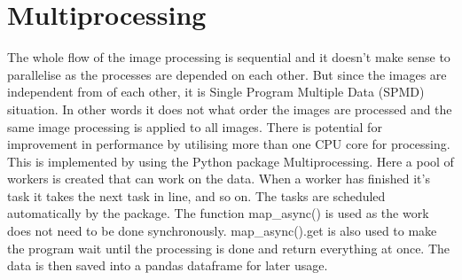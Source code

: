 \section{Multiprocessing}
The whole flow of the image processing is sequential and it doesn't make sense to parallelise as the processes are depended on each other. But since the images are independent from of each other, it is Single Program Multiple Data (SPMD) situation. In other words it does not what order the images are processed and the same image processing is applied to all images. There is potential for improvement in performance by utilising more than one CPU core for processing. This is implemented by using the Python package Multiprocessing. Here a pool of workers is created that can work on the data. When a worker has finished it's task it takes the next task in line, and so on. The tasks are scheduled automatically by the package. The function map_async() is used as the work does not need to be done synchronously. map_async().get is also used to make the program wait until the processing is done and return everything at once. The data is then saved into a pandas dataframe for later usage.